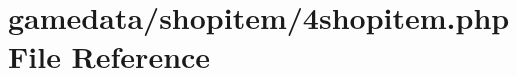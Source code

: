 \hypertarget{4shopitem_8php}{\section{gamedata/shopitem/4shopitem.php File Reference}
\label{4shopitem_8php}
}
